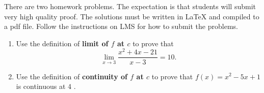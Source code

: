 \documentclass{article}
\begin{document}

There are two homework problems. The expectation is that students
will submit very high quality proof. The solutions must be written
in LaTeX and compiled to a pdf file. 
Follow the instructions on LMS for how to submit the problems.

\bigskip
\bigskip


\begin{enumerate}

\item Use the definition of {\bf limit of $f$ at $c$} to prove that 
$$ \lim_{x\to 3} \frac{x^2+4x-21}{x-3} = 10.$$

\item Use the definition of {\bf continuity of $f$ at $c$} to prove that 
$f(x) = x^2 - 5x+1$ is continuous at $4$ .

\end{enumerate}
\end{document}

